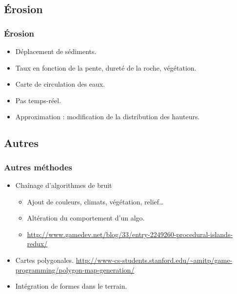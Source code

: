 \documentclass[hyperref={pdfpagelabels=false}]{beamer}
\begin{document}
\subsection{Érosion}

\begin{frame}
  \frametitle{Érosion}
  \begin{itemize}
  \item<1-> Déplacement de sédiments.
  \item<2-> Taux en fonction de la pente, dureté de la roche, végétation.
  \item<3-> Carte de circulation des eaux.
  \item<4-> Pas temps-réel.
  \item<5-6> Approximation : modification de la distribution des hauteurs.
    \begin{figure}[h]
      \centering
      \begin{tikzpicture}
      \end{tikzpicture}
    \end{figure}
  \end{itemize}
\end{frame}

\subsection{Autres}
\begin{frame}
  \frametitle{Autres méthodes}
  \begin{itemize}
  \item<1-> Chaînage d'algorithmes de bruit
    \begin{itemize}
    \item Ajout de couleurs, climats, végétation, relief\dots{}
    \item Altération du comportement d'un algo.
    \item {\tiny\url{http://www.gamedev.net/blog/33/entry-2249260-procedural-islands-redux/}}
    \end{itemize}
  \item<2-> Cartes polygonales. {\tiny\url{http://www-cs-students.stanford.edu/~amitp/game-programming/polygon-map-generation/}}
  \item<3-> Intégration de formes dans le terrain.
  \end{itemize}
\end{frame}
\end{document}
